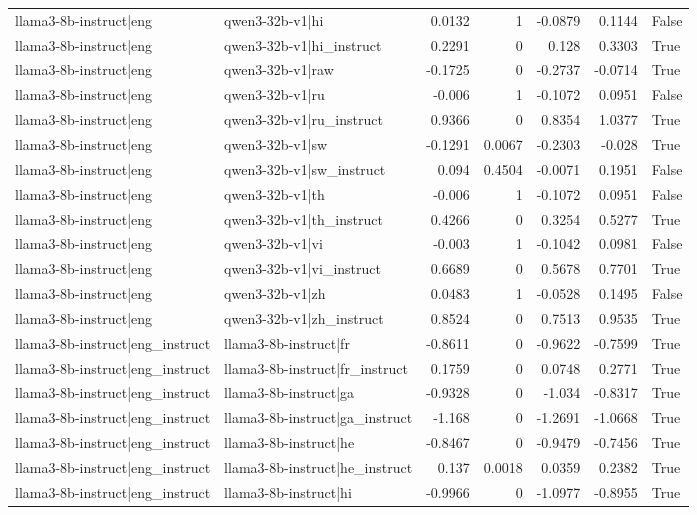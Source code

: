 \begin{table}
\begin{tabular}{l l r r r r l}
llama3-8b-instruct|eng & qwen3-32b-v1|hi & 0.0132 & 1 & -0.0879 & 0.1144 & False \\
llama3-8b-instruct|eng & qwen3-32b-v1|hi_instruct & 0.2291 & 0 & 0.128 & 0.3303 & True \\
llama3-8b-instruct|eng & qwen3-32b-v1|raw & -0.1725 & 0 & -0.2737 & -0.0714 & True \\
llama3-8b-instruct|eng & qwen3-32b-v1|ru & -0.006 & 1 & -0.1072 & 0.0951 & False \\
llama3-8b-instruct|eng & qwen3-32b-v1|ru_instruct & 0.9366 & 0 & 0.8354 & 1.0377 & True \\
llama3-8b-instruct|eng & qwen3-32b-v1|sw & -0.1291 & 0.0067 & -0.2303 & -0.028 & True \\
llama3-8b-instruct|eng & qwen3-32b-v1|sw_instruct & 0.094 & 0.4504 & -0.0071 & 0.1951 & False \\
llama3-8b-instruct|eng & qwen3-32b-v1|th & -0.006 & 1 & -0.1072 & 0.0951 & False \\
llama3-8b-instruct|eng & qwen3-32b-v1|th_instruct & 0.4266 & 0 & 0.3254 & 0.5277 & True \\
llama3-8b-instruct|eng & qwen3-32b-v1|vi & -0.003 & 1 & -0.1042 & 0.0981 & False \\
llama3-8b-instruct|eng & qwen3-32b-v1|vi_instruct & 0.6689 & 0 & 0.5678 & 0.7701 & True \\
llama3-8b-instruct|eng & qwen3-32b-v1|zh & 0.0483 & 1 & -0.0528 & 0.1495 & False \\
llama3-8b-instruct|eng & qwen3-32b-v1|zh_instruct & 0.8524 & 0 & 0.7513 & 0.9535 & True \\
llama3-8b-instruct|eng_instruct & llama3-8b-instruct|fr & -0.8611 & 0 & -0.9622 & -0.7599 & True \\
llama3-8b-instruct|eng_instruct & llama3-8b-instruct|fr_instruct & 0.1759 & 0 & 0.0748 & 0.2771 & True \\
llama3-8b-instruct|eng_instruct & llama3-8b-instruct|ga & -0.9328 & 0 & -1.034 & -0.8317 & True \\
llama3-8b-instruct|eng_instruct & llama3-8b-instruct|ga_instruct & -1.168 & 0 & -1.2691 & -1.0668 & True \\
llama3-8b-instruct|eng_instruct & llama3-8b-instruct|he & -0.8467 & 0 & -0.9479 & -0.7456 & True \\
llama3-8b-instruct|eng_instruct & llama3-8b-instruct|he_instruct & 0.137 & 0.0018 & 0.0359 & 0.2382 & True \\
llama3-8b-instruct|eng_instruct & llama3-8b-instruct|hi & -0.9966 & 0 & -1.0977 & -0.8955 & True \\

\end{tabular}
\end{table}
